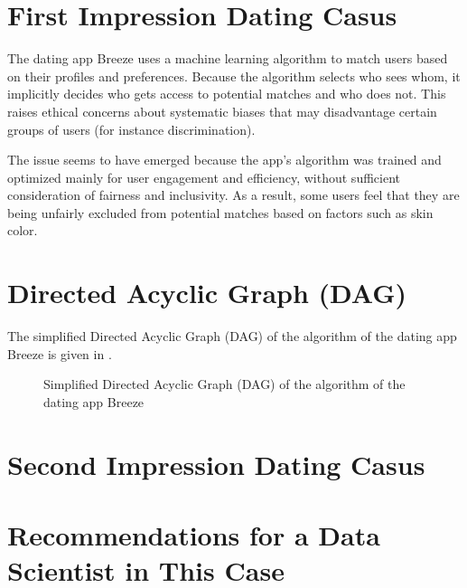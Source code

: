 \documentclass[11pt, twoside]{article}
\numberwithin{equation}{section}
\newcommand{\fullref}[1]{\hyperref[#1]{\Cref{#1}}}
\begin{document}

\newpage
{}
\setcounter{page}{1}

\section{First Impression Dating Casus}
The dating app Breeze uses a machine learning algorithm to match users based on their profiles and preferences. Because the algorithm selects who sees whom, it implicitly decides who gets access to potential matches and who does not. This raises ethical concerns about systematic biases that may disadvantage certain groups of users (for instance discrimination). 

The issue seems to have emerged because the app's algorithm was trained and optimized mainly for user engagement and efficiency, without sufficient consideration of fairness and inclusivity. As a result, some users feel that they are being unfairly excluded from potential matches based on factors such as skin color.

\section{Directed Acyclic Graph (DAG)}
The simplified Directed Acyclic Graph (DAG) of the algorithm of the dating app Breeze is given in \fullref{fig:DAG}. 

\begin{figure}[h!]
\centering
{}
\caption{Simplified Directed Acyclic Graph (DAG) of the algorithm of the dating app Breeze}
\label{fig:DAG}
\end{figure}

\section{Second Impression Dating Casus}

\section{Recommendations for a Data Scientist in This Case}

\clearpage

\printbibliography[heading=bibintoc]
\end{document}
